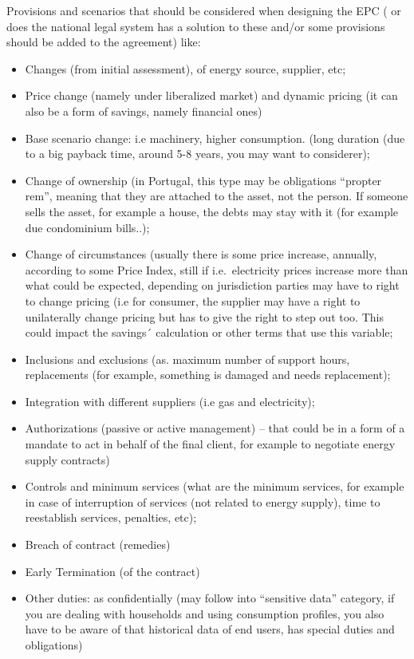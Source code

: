 \documentclass[]{book}
\theoremstyle{definition}
\theoremstyle{definition}
\theoremstyle{definition}
\theoremstyle{remark}
\begin{document}
Provisions and scenarios that should be considered when designing the
EPC ( or does the national legal system has a solution to these and/or
some provisions should be added to the agreement) like:

\begin{itemize}
\item
  Changes (from initial assessment), of energy source, supplier, etc;
\item
  Price change (namely under liberalized market) and dynamic pricing (it
  can also be a form of savings, namely financial ones)
\item
  Base scenario change: i.e machinery, higher consumption. (long
  duration (due to a big payback time, around 5-8 years, you may want to
  considerer);
\item
  Change of ownership (in Portugal, this type may be obligations
  ``propter rem'', meaning that they are attached to the asset, not the
  person. If someone sells the asset, for example a house, the debts may
  stay with it (for example due condominium bills..);
\item
  Change of circumstances (usually there is some price increase,
  annually, according to some Price Index, still if i.e.~electricity
  prices increase more than what could be expected, depending on
  jurisdiction parties may have to right to change pricing (i.e for
  consumer, the supplier may have a right to unilaterally change pricing
  but has to give the right to step out too. This could impact the
  savings´ calculation or other terms that use this variable;
\item
  Inclusions and exclusions (as. maximum number of support hours,
  replacements (for example, something is damaged and needs
  replacement);
\item
  Integration with different suppliers (i.e gas and electricity);
\item
  Authorizations (passive or active management) -- that could be in a
  form of a mandate to act in behalf of the final client, for example to
  negotiate energy supply contracts)
\item
  Controls and minimum services (what are the minimum services, for
  example in case of interruption of services (not related to energy
  supply), time to reestablish services, penalties, etc);
\item
  Breach of contract (remedies)
\item
  Early Termination (of the contract)
\item
  Other duties: as confidentially (may follow into ``sensitive data''
  category, if you are dealing with households and using consumption
  profiles, you also have to be aware of that historical data of end
  users, has special duties and obligations)
\end{itemize}
\end{document}
